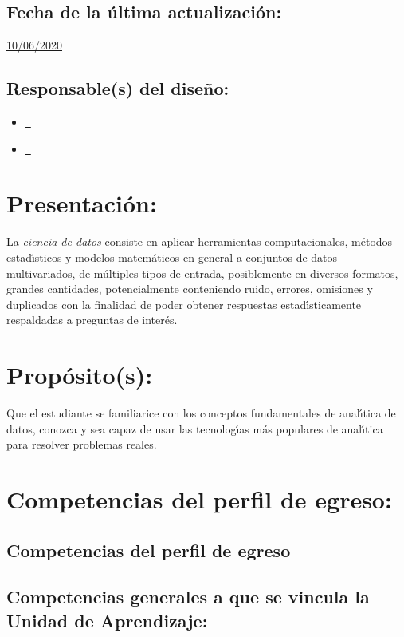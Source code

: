 \documentclass[10 pt]{article}
\begin{document}
\subsection{Fecha de la \'{u}ltima actualizaci\'{o}n:} \underline{10/06/2020}
\subsection{Responsable(s) del dise\~{n}o:}
\begin{itemize}[label={}]
\item \underline{\nferny~\ferny}
\item \underline{\nelisa~\elisa}
\end{itemize}
\newpage
\section{Presentaci\'{o}n:}

La {\em ciencia de datos} consiste en aplicar herramientas
computacionales, m\'{e}todos estad\'{\i}sticos y modelos
matem\'{a}ticos en general a conjuntos de datos multivariados, de
m\'{u}ltiples tipos de entrada, posiblemente en diversos formatos,
grandes cantidades, potencialmente conteniendo ruido, errores,
omisiones y duplicados con la finalidad de poder obtener respuestas
estad\'{\i}sticamente respaldadas a preguntas de inter\'{e}s.

\section{Prop\'{o}sito(s):}

Que el estudiante se familiarice con los conceptos fundamentales de
anal\'{\i}tica de datos, conozca y sea capaz de usar las tecnolog\'{\i}as m\'{a}s
populares de anal\'{\i}tica para resolver problemas reales.

\section{Competencias del perfil de egreso:}
\subsection{Competencias del perfil de egreso}







\subsection{Competencias generales a que se vincula la Unidad de
  Aprendizaje:}
\end{document}
